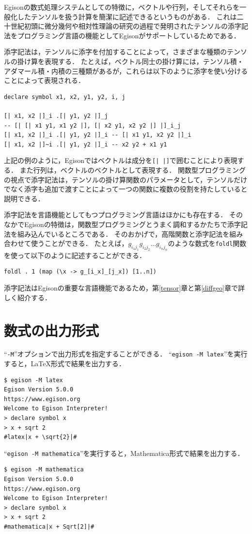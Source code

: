 Egisonの数式処理システムとしての特徴に，ベクトルや行列，そしてそれらを一般化したテンソルを扱う計算を簡潔に記述できるというものがある．
これは二十世紀初頭に微分幾何や相対性理論の研究の過程で発明されたテンソルの添字記法をプログラミング言語の機能としてEgisonがサポートしているためである．

添字記法は，テンソルに添字を付加することによって，さまざまな種類のテンソルの掛け算を表現する．
たとえば，ベクトル同士の掛け算には，テンソル積・アダマール積・内積の三種類があるが，これらは以下のように添字を使い分けることによって表現される．
\begin{lstlisting}[language=egison,numbers=none]
declare symbol x1, x2, y1, y2, i, j

[| x1, x2 |]_i .[| y1, y2 |]_j
-- [| [| x1 y1, x1 y2 |], [| x2 y1, x2 y2 |] |]_i_j
[| x1, x2 |]_i .[| y1, y2 |]_i -- [| x1 y1, x2 y2 |]_i
[| x1, x2 |]~i .[| y1, y2 |]_i -- x2 y2 + x1 y1
\end{lstlisting}
上記の例のように，Egisonではベクトルは成分を\lstinline{[| |]}で囲むことにより表現する．
また行列は，ベクトルのベクトルとして表現する．
関数型プログラミングの視点で添字記法は，テンソルの掛け算関数のパラメータとして，テンソルだけでなく添字も追加で渡すことによって一つの関数に複数の役割を持たしていると説明できる．

添字記法を言語機能としてもつプログラミング言語はほかにも存在する．
そのなかでEgisonの特徴は，関数型プログラミングとうまく調和するかたちで添字記法を組み込んでいるところである．
そのおかげで，高階関数と添字記法を組み合わせて使うことができる．
たとえば，$g_{i_{1}j_{1}} g_{i_{2}j_{2}} ... g_{i_{n}j_{n}}$のような数式を\lstinline{foldl}関数を使って以下のように記述することができる．
\begin{lstlisting}[language=egison,numbers=none]
foldl . 1 (map (\x -> g_[i_x]_[j_x]) [1..n])
\end{lstlisting}

添字記法はEgisonの重要な言語機能であるため，第\ref{tensor}章と第\ref{diffgeo}章で詳しく紹介する．

\section{数式の出力形式}

``\texttt{-M}''オプションで出力形式を指定することができる．
``\texttt{egison -M latex}''を実行すると，LaTeX形式で結果を出力する．
\begin{lstlisting}[language=egison,numbers=none]
$ egison -M latex
Egison Version 5.0.0
https://www.egison.org
Welcome to Egison Interpreter!
> declare symbol x
> x + sqrt 2
#latex|x + \sqrt{2}|#
\end{lstlisting}
``\texttt{egison -M mathematica}''を実行すると，Mathematica形式で結果を出力する．
\begin{lstlisting}[language=egison,numbers=none]
$ egison -M mathematica
Egison Version 5.0.0
https://www.egison.org
Welcome to Egison Interpreter!
> declare symbol x
> x + sqrt 2
#mathematica|x + Sqrt[2]|#
\end{lstlisting}


